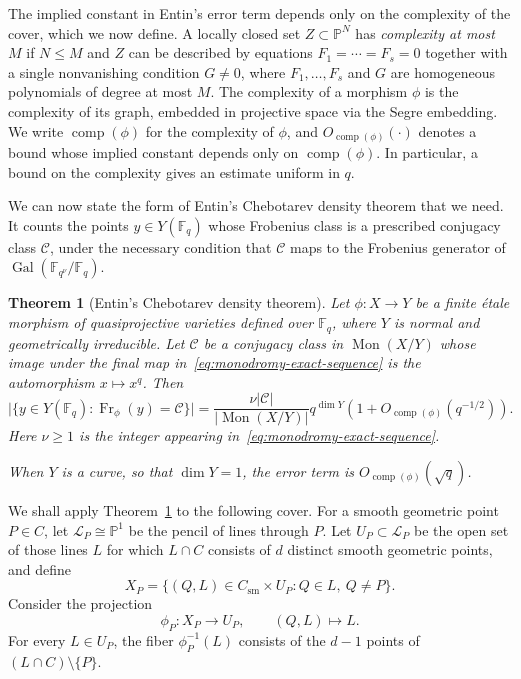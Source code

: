 \documentclass[10pt,a4paper]{amsart}
\newtheorem{theorem}{Theorem}[section]
\theoremstyle{definition}
\theoremstyle{remark}
\newcommand{\bF}{\mathbb{F}}
\newcommand{\Fq}{\mathbb{F}_q}
\newcommand{\bP}{\mathbb{P}}
\begin{document}
The implied constant in Entin's error term depends only on the complexity of the cover, which we now define. A locally closed set $Z\subset\bP^N$ has \emph{complexity at most $M$} if $N\leq M$ and $Z$ can be described by equations $F_1=\cdots=F_s=0$ together with a single nonvanishing condition $G\neq 0$, where $F_1,\ldots,F_s$ and $G$ are homogeneous polynomials of degree at most $M$. The complexity of a morphism $\phi$ is the complexity of its graph, embedded in projective space via the Segre embedding. We write $\operatorname{comp}(\phi)$ for the complexity of $\phi$, and $O_{\operatorname{comp}(\phi)}(\cdot)$ denotes a bound whose implied constant depends only on $\operatorname{comp}(\phi)$. In particular, a bound on the complexity gives an estimate uniform in $q$.

We can now state the form of Entin's Chebotarev density theorem \cite[Theorem~3]{Ent21} that we need. It counts the points $y\in Y(\Fq)$ whose Frobenius class is a prescribed conjugacy class $\mathcal C$, under the necessary condition that $\mathcal C$ maps to the Frobenius generator of $\operatorname{Gal}(\bF_{q^\nu}/\Fq)$.

\begin{theorem}[Entin's Chebotarev density theorem]\label{thm:entin-chebotarev}
Let $\phi\colon X\to Y$ be a finite \'etale morphism of quasiprojective varieties defined over $\Fq$, where $Y$ is normal and geometrically irreducible. Let $\mathcal{C}$ be a conjugacy class in $\operatorname{Mon}(X/Y)$ whose image under the final map in~\eqref{eq:monodromy-exact-sequence} is the automorphism $x\mapsto x^q$. Then
\[
\bigl|\{y\in Y(\Fq):\operatorname{Fr}_{\phi}(y)=\mathcal{C}\}\bigr|
=
\frac{\nu|\mathcal{C}|}{|\operatorname{Mon}(X/Y)|}q^{\dim Y}
\left(1+O_{\operatorname{comp}(\phi)}(q^{-1/2})\right).
\]
Here $\nu\geq 1$ is the integer appearing in~\eqref{eq:monodromy-exact-sequence}.

When $Y$ is a curve, so that $\dim Y=1$, the error term is
$O_{\operatorname{comp}(\phi)}(\sqrt q)$.
\end{theorem}

We shall apply Theorem~\ref{thm:entin-chebotarev} to the following cover. For a smooth geometric point $P\in C$, let $\mathcal L_P\cong\bP^1$ be the pencil of lines through $P$. Let $U_P\subset\mathcal L_P$ be the open set of those lines $L$ for which $L\cap C$ consists of $d$ distinct smooth geometric points, and define
\[
X_P=\{(Q,L)\in C_{\mathrm{sm}}\times U_P:Q\in L,\ Q\neq P\}.
\]
Consider the projection
\[
\phi_P\colon X_P\longrightarrow U_P,
\qquad
(Q,L)\longmapsto L.
\]
For every $L\in U_P$, the fiber $\phi_P^{-1}(L)$ consists of the $d-1$ points of $(L\cap C)\setminus\{P\}$.
\end{document}
